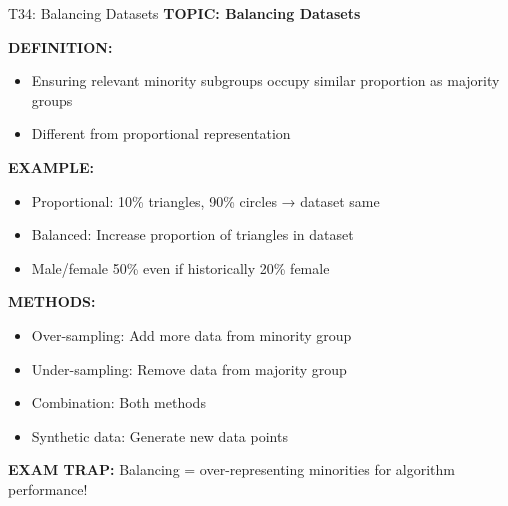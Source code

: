 \documentclass[8pt]{beamer}
\begin{document}
	\begin{frame}{T34: Balancing Datasets}
		\fontsize{6.5}{7.5}\selectfont
		\textbf{TOPIC: Balancing Datasets}
		
		\vspace{0.1cm}
		\textbf{DEFINITION:}
		\begin{itemize}
			\item Ensuring relevant minority subgroups occupy similar proportion as majority groups
			\item Different from proportional representation
		\end{itemize}
		
		\vspace{0.1cm}
		\textbf{EXAMPLE:}
		\begin{itemize}
			\item \textcolor{myblue}{Proportional:} 10\% triangles, 90\% circles → dataset same
			\item \textcolor{myblue}{Balanced:} Increase proportion of triangles in dataset
			\item Male/female 50\% even if historically 20\% female
		\end{itemize}
		
		\vspace{0.1cm}
		\textbf{METHODS:}
		\begin{itemize}
			\item \textcolor{myblue}{Over-sampling:} Add more data from minority group
			\item \textcolor{myblue}{Under-sampling:} Remove data from majority group
			\item \textcolor{myblue}{Combination:} Both methods
			\item \textcolor{myblue}{Synthetic data:} Generate new data points
		\end{itemize}
		
		\textcolor{myred}{\textbf{EXAM TRAP:}} Balancing = \textcolor{myblue}{over-representing minorities} for algorithm performance!
	\end{frame}
	
\end{document}
